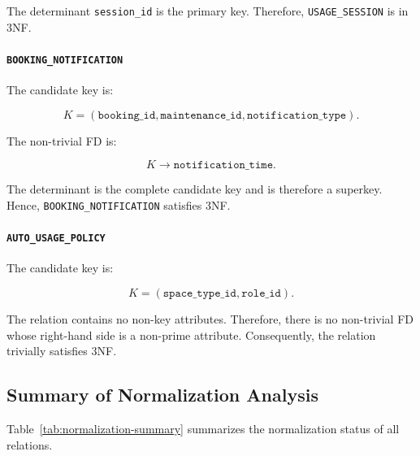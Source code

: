 The determinant \texttt{session\_id} is the primary key. Therefore,
\texttt{USAGE\_SESSION} is in 3NF.

\paragraph{\texttt{BOOKING\_NOTIFICATION}}

The candidate key is:

\[
K =
(\texttt{booking\_id},
\texttt{maintenance\_id},
\texttt{notification\_type}).
\]

The non-trivial FD is:

\[
K \rightarrow \texttt{notification\_time}.
\]

The determinant is the complete candidate key and is therefore a
superkey. Hence, \texttt{BOOKING\_NOTIFICATION} satisfies 3NF.

\paragraph{\texttt{AUTO\_USAGE\_POLICY}}

The candidate key is:

\[
K =
(\texttt{space\_type\_id},\texttt{role\_id}).
\]

The relation contains no non-key attributes. Therefore, there is no
non-trivial FD whose right-hand side is a non-prime attribute.
Consequently, the relation trivially satisfies 3NF.

\subsection{Summary of Normalization Analysis}

Table~\ref{tab:normalization-summary} summarizes the normalization
status of all relations.

